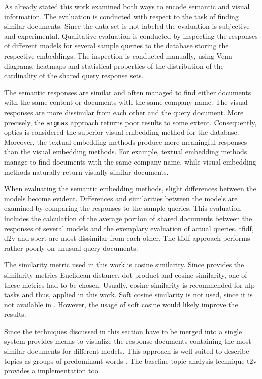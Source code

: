 As already stated this work examined both ways to encode semantic and visual information.
The evaluation is conducted with respect to the task of finding similar documents.
Since the data set is not labeled the evaluation is subjective and experimental.
Qualitative evaluation is conducted by inspecting the responses of different models for several sample queries to the database 
storing the respective embeddings.
The inspection is conducted manually, 
using Venn diagrams, heatmaps and 
statistical properties of the distribution of the cardinality of the shared query response sets.

The semantic responses are similar and often managed to find either documents with the same content or documents with the same company name.
The visual responses are more dissimilar from each other and the query document.
More precisely, the \texttt{argmax} approach returns poor results to some extent.
Consequently, \ac{optics} is considered the superior visual embedding method for the database.
Moreover, the textual embedding methods produce more meaningful responses than the visual embedding methods.
For example, textual embedding methods manage to find documents with the same company name, 
while visual embedding methods naturally return visually similar documents.


When evaluating the semantic embedding methods, slight differences between the models become evident.
Differences and similarities between the models are examined by comparing the responses to the sample queries.
This evaluation includes the calculation of the average portion of shared documents between the responses of several models 
and the exemplary evaluation of actual queries.
\ac{tfidf}, \ac{d2v} and \ac{sbert} are most dissimilar from each other.
The \ac{tfidf} approach performs rather poorly on unusual query documents.


The similarity metric used in this work is cosine similarity.
Since \databaseName{} provides the similarity metrics Euclidean distance, dot product and cosine similarity,
one of these metrics had to be chosen.
Usually, cosine similarity is recommended for \ac{nlp} tasks and thus, applied in this work.
Soft cosine similarity is not used, since it is not available in \databaseName{}.
However, the usage of soft cosine would likely improve the results.

Since the techniques discussed in this section have to be merged into a single system 
\wordcloud{} provides means to visualize the response documents containing the most similar documents for different models.
This approach is well suited to describe topics as groups of predominant words \cite{topic_modeling2019}.
The baseline topic analysis technique \ac{t2v} provides a \wordcloud{} implementation too.

